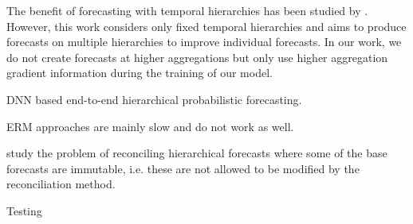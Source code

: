 \documentclass{article}
\begin{document}
  The benefit of forecasting with temporal hierarchies has been studied by \cite{athanasopoulos_forecasting_2017}. However, this work considers only fixed temporal hierarchies and aims to produce forecasts on multiple hierarchies to improve individual forecasts. In our work, we do not create forecasts at higher aggregations but only use higher aggregation gradient information during the training of our model.

  \cite{rangapuram_endtoend_2021} DNN based end-to-end hierarchical probabilistic forecasting.

  \cite{bentaieb_regularized_2019} ERM approaches are mainly slow and do not work as well.

  \cite{taieb_sparse_2017}

  \cite{zhang_optimal_2022} study the problem of reconciling hierarchical forecasts where some of the base forecasts are immutable, i.e. these are not allowed to be modified by the reconciliation method. 

  Testing
  
\end{document}
